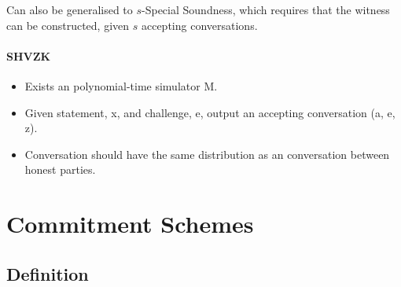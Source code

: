 Can also be generalised to $s$-Special Soundness, which requires that the
witness can be constructed, given $s$ accepting conversations.

\paragraph{SHVZK}
\begin{itemize}
  \item Exists an polynomial-time simulator M.
  \item Given statement, x, and challenge, e, output an accepting
    conversation (a, e, z).
  \item Conversation should have the same distribution as an conversation
    between honest parties.
\end{itemize}

\section{Commitment Schemes}
\label{sec:commitment}

\subsection{Definition}
\label{sec:commitment:definition}



